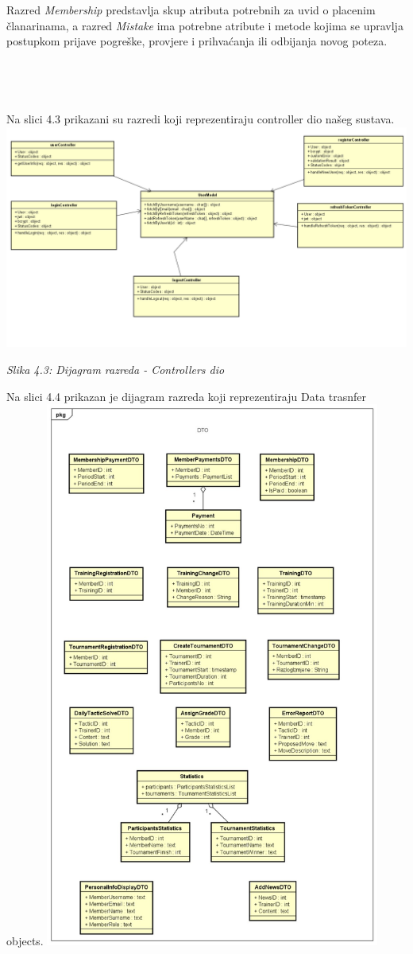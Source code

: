 \documentclass{article}
\begin{document}
	Razred\textit{ Membership} predstavlja skup atributa potrebnih za uvid o placenim članarinama, a razred \textit{Mistake} ima potrebne atribute i metode kojima se upravlja postupkom prijave pogreške, provjere i prihvaćanja ili odbijanja novog poteza.
	\\
	\\
	\\
	\\
	\\
	Na slici 4.3 prikazani su razredi koji reprezentiraju controller dio našeg sustava. 
	\includegraphics[width=\columnwidth]{controllers}
		\begin{center}
			\textit{Slika 4.3: Dijagram razreda - Controllers dio}
		\end{center}
	\eject
	Na slici 4.4 prikazan je dijagram razreda koji reprezentiraju Data trasnfer objects.
	\includegraphics[width=\columnwidth, height=18cm]{dto_class_diagram}
\end{document}
